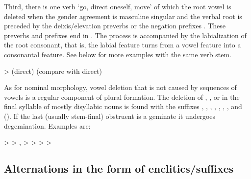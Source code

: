 Third, there is one verb `go, direct oneself, move' of which the root vowel  is deleted when the gender agreement is masculine singular and the verbal root is preceded by the deixis/elevation preverbs or the negation prefixes . These preverbs and prefixes end in . The process is accompanied by the labialization of the root consonant, that is, the labial feature turns from a vowel feature into a consonantal feature. See  below for more examples with the same verb stem.
%
\begin{exe}
	\ex	{} >  \newline\hspace*{1em}(direct) (compare with  direct)	\label{ex:habulqan phon}
\end{exe}

As for nominal morphology, vowel deletion that is not caused by sequences of vowels is a regular component of plural formation. The deletion of , , or  in the final syllable of mostly disyllabic nouns is found with the suffixes , , , , , , , and  (). If the last (usually stem-final) obstruent is a geminate it undergoes degemination. Examples are:
%
\begin{exe}
	\ex	\label{ex:vowel syncope nouns phon}
	\begin{xlist}
		\ex	{} >  
		\ex	{} >  ,
		\ex	{} >  
		\ex	{} >  
		\ex	{} >  
		\ex	{} >  
	\end{xlist}
\end{exe}



\subsection{Alternations in the form of enclitics\slash suffixes}
\label{ssec:Alternations in the form of enclitics / suffixes}

